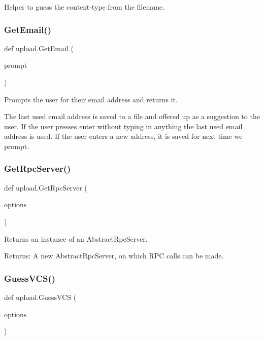\begin{DoxyVerb}Helper to guess the content-type from the filename.\end{DoxyVerb}
 \mbox{\label{namespaceupload_a4f169469a6d43221ebd38cfd546484e1}} 
\subsubsection{\texorpdfstring{GetEmail()}{GetEmail()}}
{\footnotesize\ttfamily def upload.\+Get\+Email (\begin{DoxyParamCaption}\item[{}]{prompt }\end{DoxyParamCaption})}

\begin{DoxyVerb}Prompts the user for their email address and returns it.

The last used email address is saved to a file and offered up as a suggestion
to the user. If the user presses enter without typing in anything the last
used email address is used. If the user enters a new address, it is saved
for next time we prompt.\end{DoxyVerb}
 \mbox{\label{namespaceupload_a1dadef480a702dbc5d0fb66203b9abe7}} 
\subsubsection{\texorpdfstring{GetRpcServer()}{GetRpcServer()}}
{\footnotesize\ttfamily def upload.\+Get\+Rpc\+Server (\begin{DoxyParamCaption}\item[{}]{options }\end{DoxyParamCaption})}

\begin{DoxyVerb}Returns an instance of an AbstractRpcServer.

Returns:
  A new AbstractRpcServer, on which RPC calls can be made.
\end{DoxyVerb}
 \mbox{\label{namespaceupload_a31390568253accd22ee51861eaeb99bd}} 
\subsubsection{\texorpdfstring{GuessVCS()}{GuessVCS()}}
{\footnotesize\ttfamily def upload.\+Guess\+V\+CS (\begin{DoxyParamCaption}\item[{}]{options }\end{DoxyParamCaption})}

